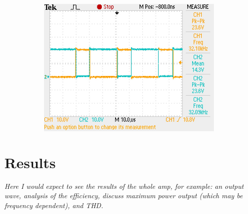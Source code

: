 \documentclass[11pt]{article}
\begin{document}
{\begin{figure}[h!]
  \begin{subfigure}{0.3\textwidth}
      \includegraphics[width=\columnwidth]{img/testing/power_output/fet_output.JPG}
  \end{subfigure}
  \caption{}
\end{figure}


\section{Results}
 
\textit{Here I would expect to see the results of the whole amp, for example: an output wave, analysis of the efficiency, discuss maximum power output (which may be frequency dependent), and THD.} 
 
}
\end{document}
